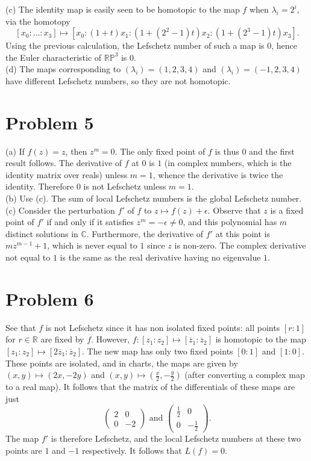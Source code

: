 \documentclass{amsart}
\numberwithin{equation}{section}
\theoremstyle{plain}
\theoremstyle{definition}
\theoremstyle{remark}
\renewcommand{\_}[2]{\underbrace{#1}_{#2}}
\renewcommand{\^}[2]{\overbrace{#1}_{#2}}
\newcommand{\R}{\mathbb{R}}
\renewcommand{\P}{\mathbb{P}}
\newcommand{\C}{\mathbb{C}}
\begin{document}
(c) The identity map is easily seen to be homotopic to the map $f$ when $\lambda_i = 2^i$, via the homotopy \[[x_0:\dots:x_3] \mapsto [x_0:(1+t)x_1:(1+(2^2-1)t)x_2:(1+(2^3-1)t)x_3].\] Using the previous calculation, the Lefschetz number of such a map is $0$, hence the Euler characteristic of $\R\P^3$ is $0$.\\

(d) The maps corresponding to $(\lambda_i) = (1,2,3,4)$ and $(\lambda_i) = (-1,2,3,4)$ have different Lefschetz numbers, so they are not homotopic.

\section*{Problem 5}

(a) If $f(z) = z$, then $z^m = 0$. The only fixed point of $f$ is thus $0$ and the first result follows. The derivative of $f$ at $0$ is $1$ (in complex numbers, which is the identity matrix over reals) unless $m = 1$, whence the derivative is twice the identity. Therefore $0$ is not Lefschetz unless $m = 1$.\\

(b) Use (c). The sum of local Lefschetz numbers is the global Lefschetz number.\\

(c) Consider the perturbation $f'$ of $f$ to $z\mapsto f(z) + \epsilon$. Observe that $z$ is a fixed point of $f'$ if and only if it satisfies $z^m = -\epsilon \neq 0$, and this polynomial has $m$ distinct solutions in $\C$. Furthermore, the derivative of $f'$ at this point is $mz^{m-1} + 1$, which is never equal to $1$ since $z$ is non-zero. The complex derivative not equal to $1$ is the same as the real derivative having no eigenvalue $1$.

\section*{Problem 6}
See that $f$ is not Lefschetz since it has non isolated fixed points: all points $[r:1]$ for $r\in \R$ are fixed by $f$. However, $f:[z_1:z_2] \mapsto [\overline z_1: \overline z_2]$ is homotopic to the map $[z_1:z_2] \mapsto [2\overline z_1: \overline z_2]$. The new map has only two fixed points $[0:1]$ and $[1:0]$. These points are isolated, and in charts, the maps are given by $(x,y) \mapsto (2x, -2y)$ and $(x,y) \mapsto (\frac x2,-\frac y2)$ (after converting a complex map to a real map). It follows that the matrix of the differentials of these maps are just \[
  \begin{pmatrix}
    2 & 0 \\ 0 & -2
  \end{pmatrix} \text{ and }
  \begin{pmatrix}
    \frac12 & 0 \\ 0 & -\frac12
  \end{pmatrix}.
\]
The map $f'$ is therefore Lefschetz, and the local Lefschetz numbers at these two points are $1$ and $-1$ respectively. It follows that $L(f) = 0$. 
\end{document}
